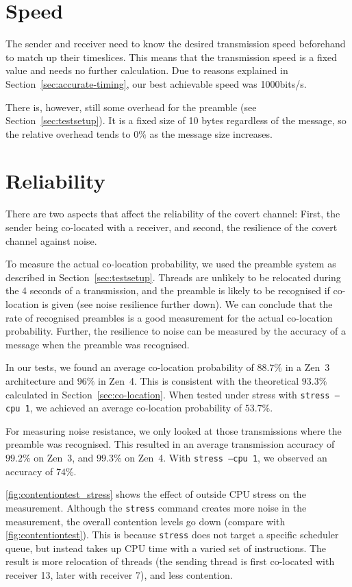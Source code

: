 \documentclass[11pt,
  titlepage=false,
]{scrreprt}
\begin{document}
\section{Speed}
The sender and receiver need to know the desired transmission speed beforehand to match up their timeslices.
This means that the transmission speed is a fixed value and needs no further calculation.
Due to reasons explained in Section~\ref{sec:accurate-timing}, our best achievable speed was 1000bits/s.

There is, however, still some overhead for the preamble (see Section~\ref{sec:testsetup}).
It is a fixed size of 10 bytes regardless of the message,
so the relative overhead tends to $0\%$ as the message size increases.

\section{Reliability}
There are two aspects that affect the reliability of the covert channel:
First, the sender being co-located with a receiver, and second, the resilience of the covert channel against noise.

To measure the actual co-location probability, we used the preamble system as described in Section~\ref{sec:testsetup}.
Threads are unlikely to be relocated during the 4 seconds of a transmission,
and the preamble is likely to be recognised if co-location is given (see noise resilience further down).
We can conclude that the rate of recognised preambles is a good measurement for the actual co-location probability.
Further, the resilience to noise can be measured by the accuracy of a message when the preamble was recognised.

In our tests, we found an average co-location probability of $88.7\%$ in a Zen~3 architecture and $96\%$ in Zen~4.
This is consistent with the theoretical $93.3\%$ calculated in Section~\ref{sec:co-location}.
When tested under stress with \texttt{stress --cpu 1}, we achieved an average co-location probability of $53.7\%$.

For measuring noise resistance, we only looked at those transmissions where the preamble was recognised.
This resulted in an average transmission accuracy of $99.2\%$ on Zen~3, and $99.3\%$ on Zen~4.
With \texttt{stress --cpu 1}, we observed an accuracy of $74\%$.

\ref{fig:contentiontest_stress} shows the effect of outside CPU stress on the measurement.
Although the \texttt{stress} command creates more noise in the measurement, the overall contention levels go down (compare with \ref{fig:contentiontest}).
This is because \texttt{stress} does not target a specific scheduler queue, but instead takes up CPU time with a varied set of instructions.
The result is more relocation of threads (the sending thread is first co-located with receiver 13, later with receiver 7), and less contention.
\end{document}
